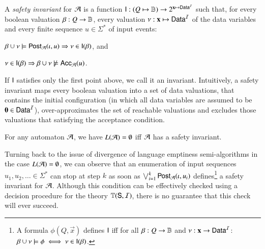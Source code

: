 \documentclass{llncs}
\begin{document}
A \emph{safety invariant} for $\mathcal{A}$ is a function $\mathsf{I} : (Q \mapsto
\mathbb{B}) \rightarrow 2^{\mathbf x \mapsto \mathsf{Data}^{\mathcal{I}}}$ such that, for every
boolean valuation $\beta : Q \rightarrow \mathbb{B}$, every valuation
$\nu : \mathbf x \mapsto \mathsf{Data}^{\mathcal{I}}$ of the data
variables and every finite sequence $u \in \Sigma^*$ of input events: \begin{compactenum}
%
\item\label{it1:inv} $\beta \cup \nu \models \mathsf{Post}_{\mathcal{A}}(\iota,u)
  \Rightarrow \nu \in \mathsf{I}(\beta)$, and
%
\item\label{it2:inv} $\nu \in \mathsf{I}(\beta) \Rightarrow \beta \cup \nu
  \not\models \mathsf{Acc}_{\mathcal{A}}(u)$.
\end{compactenum}
If $\mathsf{I}$ satisfies only the first point above, we call it an
invariant. Intuitively, a safety invariant maps every boolean
valuation into a set of data valuations, that contains the initial
configuration (in which all data variables are assumed to be
$\mathbf{0}\in\mathsf{Data}^{\mathcal{I}}$), over-approximates the set of reachable
valuations and excludes those valuations that satisfying the
acceptance condition.

\begin{lemma}\label{lemma:safety-invariant}
  For any automaton $\mathcal{A}$, we have $L(\mathcal{A})
= \emptyset$ iff $\mathcal{A}$ has a safety invariant. 
\end{lemma}

Turning back to the issue of divergence of language emptiness
semi-algorithms in the case $L(\mathcal{A}) = \emptyset$, we can observe that
an enumeration of input sequences $u_1,u_2,\ldots \in \Sigma^*$ can
stop at step $k$ as soon as $\bigvee_{i=1}^k \mathsf{Post}_{\mathcal{A}}(\iota,u_i)$
defines\footnote{ A formula $\phi(Q,\vec{x})$ defines $\mathsf{I}$ iff for
  all $\beta: Q \rightarrow \mathbb{B}$ and $\nu : \mathbf x \rightarrow
  \mathsf{Data}^{\mathcal{I}}$: $\beta\cup\nu \models \phi \iff \nu \in \mathsf{I}(\beta)$. } a
safety invariant for $\mathcal{A}$. Although this condition can be effectively
checked using a decision procedure for the theory $\mathbb{T}(\mathsf{S},\mathcal{I})$,
there is no guarantee that this check will ever succeed.
\end{document}
